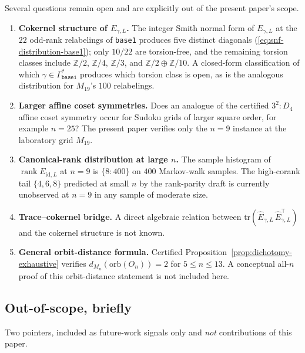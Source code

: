 \documentclass[11pt,a4paper]{article}
\theoremstyle{definition}
\theoremstyle{remark}
\providecommand{\Z}{\mathbb{Z}}
\providecommand{\rank}{\operatorname{rank}}
\newcommand{\Egamma}{E_{\gamma,L}}
\newcommand{\Ehat}{\widehat{E}_{\gamma,L}}
\begin{document}
Several questions remain open and are explicitly out of the present
paper's scope.

\begin{enumerate}[label=(O\arabic*),leftmargin=*]
   \item \textbf{Cokernel structure of $\Egamma$.} The integer Smith
   normal form of $\Egamma$ at the $22$ odd-rank relabelings of
   \texttt{base1} produces five distinct diagonals
   (\eqref{eq:snf-distribution-base1}); only $10/22$ are torsion-free,
   and the remaining torsion classes include $\Z/2$, $\Z/4$, $\Z/3$,
   and $\Z/2 \oplus \Z/10$. A
   closed-form classification of which $\gamma \in \Gamma^{*}_{\mathtt{base1}}$
   produces which torsion class is open, as is the analogous
   distribution for $M_{19}$'s $100$ relabelings.

   \item \textbf{Larger affine coset symmetries.} Does an analogue of
   the certified $3^2{:}D_4$ affine coset symmetry occur for Sudoku
   grids of larger square order, for example $n = 25$? The present
   paper verifies only the $n = 9$ instance at the laboratory grid
   $M_{19}$.

   \item \textbf{Canonical-rank distribution at large $n$.} The
   sample histogram of $\rank E_{\mathrm{id}, L}$ at $n = 9$ is
   $\{8\!:\!400\}$ on $400$ Markov-walk samples. The
   high-corank tail $\{4, 6, 8\}$ predicted at small $n$ by the
   rank-parity draft is currently unobserved at $n = 9$ in any
   sample of moderate size.

   \item \textbf{Trace--cokernel bridge.} A direct algebraic
   relation between $\mathrm{tr}(\Ehat \, \Ehat^{\!\top})$ and the
   cokernel structure is not known.

   \item \textbf{General orbit-distance formula.} Certified Proposition~\ref{prop:dichotomy-exhaustive}
   verifies $d_{M_n}(\mathrm{orb}(O_n))=2$ for $5 \le n \le 13$.
   A conceptual all-$n$ proof of this orbit-distance statement is not
   included here.
\end{enumerate}

\subsection{Out-of-scope, briefly}\label{sec:disc-oos}

Two pointers, included as future-work signals only and \emph{not}
contributions of this paper.
\end{document}
